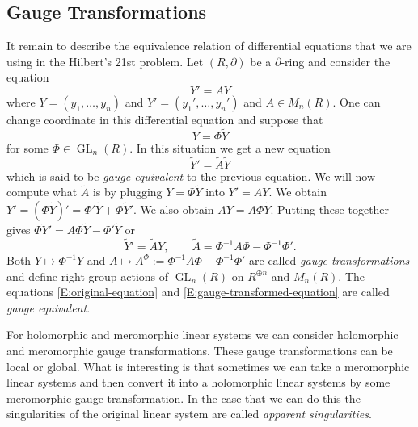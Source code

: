 \documentclass[12pt]{book}
\numberwithin{equation}{section}
\theoremstyle{definition}
\theoremstyle{remark}
\newcommand{\GL}{\operatorname{GL}}
\begin{document}
\subsection{Gauge Transformations}
It remain to describe the equivalence relation of differential equations that we are using in the Hilbert's 21st problem.
Let $(R,\partial)$ be a $\partial$-ring and consider the equation
\begin{equation}\label{E:original-equation}
Y' = AY
\end{equation}
where $Y = (y_1,\ldots,y_n)$ and $Y' =(y_1',\ldots,y_n')$ and $A \in M_n(R)$. 
One can change coordinate in this differential equation and suppose that 
\begin{equation}\label{E:gauge-trans-one}
Y = \Phi \widetilde{Y}
\end{equation}
for some $\Phi \in \GL_n(R)$. 
In this situation we get a new equation 
\begin{equation}\label{E:gauge-transformed-equation}
\widetilde{Y}' = \widetilde{A} \widetilde{Y} 
\end{equation}
which is said to be \emph{gauge equivalent} to the previous equation. 
We will now compute what $\widetilde{A}$ is by plugging $Y = \Phi \widetilde{Y}$ into $Y'=AY$. 
We obtain $Y' = (\Phi \widetilde{Y})' = \Phi' \widetilde{Y} + \Phi \widetilde{Y}'$. 
We also obtain $AY = A\Phi \widetilde{Y}$. 
Putting these together gives $\Phi \widetilde{Y}' = A\Phi \widetilde{Y} - \Phi' \widetilde{Y}$ or 
$$ \widetilde{Y}' = \widetilde{A} Y, \qquad \widetilde{A} = \Phi^{-1} A \Phi - \Phi^{-1} \Phi '.$$
Both $Y \mapsto \Phi^{-1} Y$ and $A \mapsto A^{\Phi} := \Phi^{-1} A \Phi + \Phi^{-1} \Phi'$ are called \emph{gauge transformations} and define right group actions of $\GL_n(R)$ on $R^{\oplus n}$ and $M_n(R)$.
The equations \eqref{E:original-equation} and \eqref{E:gauge-transformed-equation} are called \emph{gauge equivalent}.

For holomorphic and meromorphic linear systems we can consider holomorphic and meromorphic gauge transformations. 
These gauge transformations can be local or global. 
What is interesting is that sometimes we can take a meromorphic linear systems and then convert it into a holomorphic linear systems by some meromorphic gauge transformation. 
In the case that we can do this the singularities of the original linear system are called \emph{apparent singularities}. 
\end{document}

